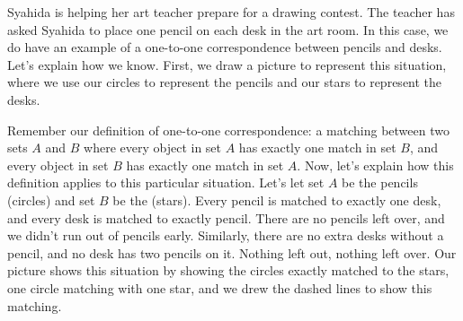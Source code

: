 \documentclass{ximera}
\begin{document}
\begin{example}
Syahida is helping her art teacher prepare for a drawing contest. The teacher has asked Syahida to place one pencil on each desk in the art room. In this case, we do have an example of a one-to-one correspondence between pencils and desks. Let's explain how we know. First, we draw a picture to represent this situation, where we use our circles to represent the pencils and our stars to represent the desks.
\begin{center}
\end{center}
Remember our definition of one-to-one correspondence: a matching between two sets $A$ and $B$ where every object in set $A$ has exactly one match in set $B$, and every object in set $B$ has exactly one match in set $A$. Now, let's explain how this definition applies to this particular situation. Let's let set $A$ be the pencils (circles) and set $B$ be the  (stars). Every pencil is matched to exactly one desk, and every desk is matched to exactly  pencil. There are no pencils left over, and we didn't run out of pencils early. Similarly, there are no extra desks without a pencil, and no desk has two pencils on it. Nothing left out, nothing left over. Our picture shows this situation by showing the circles exactly matched to the stars, one circle matching with one star, and we drew the dashed lines to show this matching. 

\end{example}
\end{document}
